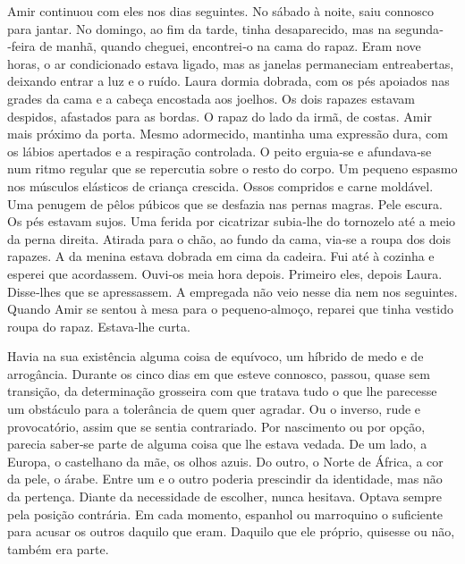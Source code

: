Amir continuou com eles nos dias seguintes. No sábado à noite, saiu
connosco para jantar. No domingo, ao fim da tarde, tinha desaparecido,
mas na segunda­‑feira de manhã, quando cheguei, encontrei­‑o na cama do
rapaz. Eram nove horas, o ar condicionado estava ligado, mas as janelas
permaneciam entreabertas, deixando entrar a luz e o ruído. Laura dormia
dobrada, com os pés apoiados nas grades da cama e a cabeça encostada aos
joelhos. Os dois rapazes estavam despidos, afastados para as bordas. O
rapaz do lado da irmã, de costas. Amir mais próximo da porta. Mesmo
adormecido, mantinha uma expressão dura, com os lábios apertados e a
respiração controlada. O peito erguia­‑se e afundava­‑se num ritmo
regular que se repercutia sobre o resto do corpo. Um pequeno espasmo nos
músculos elásticos de criança crescida. Ossos compridos e carne
moldável. Uma penugem de pêlos púbicos que se desfazia nas pernas
magras. Pele escura. Os pés estavam sujos. Uma ferida por cicatrizar
subia­‑lhe do tornozelo até a meio da perna direita. Atirada para o
chão, ao fundo da cama, via­‑se a roupa dos dois rapazes. A da menina
estava dobrada em cima da cadeira. Fui até à cozinha e esperei que
acordassem. Ouvi­‑os meia hora depois. Primeiro eles, depois Laura.
Disse­‑lhes que se apressassem. A empregada não veio nesse dia nem nos
seguintes. Quando Amir se sentou à mesa para o pequeno­‑almoço, reparei
que tinha vestido roupa do rapaz. Estava­‑lhe curta.

Havia na sua existência alguma coisa de equívoco, um híbrido de medo e
de arrogância. Durante os cinco dias em que esteve connosco, passou,
quase sem transição, da determinação grosseira com que tratava tudo o
que lhe parecesse um obstáculo para a tolerância de quem quer agradar.
Ou o inverso, rude e provocatório, assim que se sentia contrariado. Por
nascimento ou por opção, parecia saber­‑se parte de alguma coisa que lhe
estava vedada. De um lado, a Europa, o castelhano da mãe, os olhos
azuis. Do outro, o Norte de África, a cor da pele, o árabe. Entre um e o
outro poderia prescindir da identidade, mas não da pertença. Diante da
necessidade de escolher, nunca hesitava. Optava sempre pela posição
contrária. Em cada momento, espanhol ou marroquino o suficiente para
acusar os outros daquilo que eram. Daquilo que ele próprio, quisesse ou
não, também era parte.

